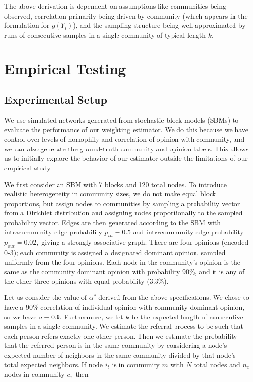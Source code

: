 \documentclass[11pt,a4paper,twocolumn,twoside]{rho-class/rho}
\begin{document}
The above derivation is dependent on assumptions like communities being observed, correlation primarily being driven by community (which appears in the formulation for $g(Y_i)$), and the sampling structure being well-approximated by runs of consecutive samples in a single community of typical length $k.$

\section{Empirical Testing}
\subsection{Experimental Setup}
We use simulated networks generated from stochastic block models (SBMs) to evaluate the performance of our weighting estimator. We do this because we have control over levels of homophily and correlation of opinion with community, and we can also generate the ground-truth community and opinion labels. This allows us to initially explore the behavior of our estimator outside the limitations of our empirical study.

We first consider an SBM with 7 blocks and 120 total nodes. To introduce realistic heterogeneity in community sizes, we do not make equal block proportions, but assign nodes to communities by sampling a probability vector from a Dirichlet distribution and assigning nodes proportionally to the sampled probability vector. Edges are then generated according to the SBM with intracommunity edge probability $p_{in} = 0.5$ and intercommunity edge probability $p_{out} = 0.02,$ giving a strongly associative graph. There are four opinions (encoded 0-3); each community is assigned a designated dominant opinion, sampled uniformly from the four opinions. Each node in the community's opinion is the same as the community dominant opinion with probability 90\%, and it is any of the other three opinions with equal probability (3.3\%). 

Let us consider the value of $\alpha^*$ derived from the above specifications. We chose to have a 90\% correlation of individual opinion with community dominant opinion, so we have $\rho = 0.9.$ Furthermore, we let $k$ be the expected length of consecutive samples in a single community. We estimate the referral process to be such that each person refers exactly one other person. Then we estimate the probability that the referred person is in the same community by considering a node's expected number of neighbors in the same community divided by that node's total expected neighbors. If node $i_t$ is in community $m$ with $N$ total nodes and $n_c$ nodes in community $c,$ then
\end{document}
